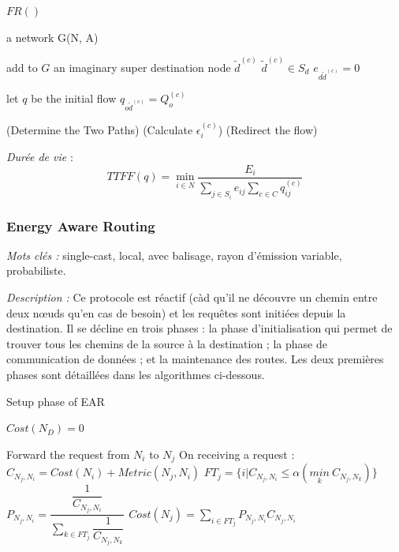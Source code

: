\begin{algorithm}[H]
\caption{$FR()$}
\label{algo_FR}
\begin{algorithmic}
\REQUIRE a network G(N, A)

add to $G$ an imaginary super destination node $\tilde{d}^{(c)}$
	\STATE $\tilde{d}^{(c)} \in S_d$
	\STATE $e_{d \tilde{d}^{(c)}} = 0$
\ENDFOR

let $q$ be the initial flow
	\STATE $q_{o \tilde{d}^{(c)}} = Q_o^{(c)}$
\ENDFOR

		\STATE (Determine the Two Paths)
		\STATE (Calculate $\epsilon_i^{(c)}$)
		\STATE (Redirect the flow)
	\ENDFOR
\ENDFOR

\RETURN 
\end{algorithmic}
\end{algorithm}



\emph{Durée de vie} :  $$TTFF(q) = \min\limits_{i \in N}\frac{E_i}{\sum \limits_{j \in S_i} {e_{ij}} \sum \limits_{c \in C} {q_{ij}^{(c)}}}$$



\subsubsection{Energy Aware Routing \cite{Shah2002}}
\emph{Mots clés :} single-cast, local, avec balisage, rayon d'émission variable, probabiliste.

\emph{Description :}
Ce protocole est réactif (càd qu'il ne découvre un chemin entre deux nœuds qu’en cas de besoin) et les requêtes sont initiées depuis la destination. Il se décline en trois phases : la phase d'initialisation qui permet de trouver tous les chemins de la source à la destination ; la phase de communication de données ; et la maintenance des routes. Les deux premières phases sont détaillées dans les algorithmes ci-dessous.

\begin{algorithm}[H]
\caption{Setup phase of EAR}
\label{algo_EAR_sp}
\begin{algorithmic}

\STATE $Cost(N_D) = 0$

			\STATE Forward the request from $N_i$ to $N_j$
		\ENDIF
	\ENDFOR
\ENDFOR
\STATE
{}
		\STATE On receiving a request :
		\STATE $C_{N_j,N_i} = Cost(N_i)+Metric(N_j,N_i)$
		\STATE $FT_j = \{i | C_{N_j,N_i} \leq \alpha (\underset{k}{min}\ C_{N_j,N_k})\}$
		\STATE
		\STATE $P_{N_j,N_i} = \dfrac{\dfrac{1}{C_{N_j,N_i}}}{\sum \limits_{k \in FT_j} \dfrac{1}{C_{N_j,N_k}}}$
		\STATE
		\STATE $Cost(N_j) = \sum \limits_{i \in FT_j} {P_{N_j,N_i} C_{N_j,N_i}}$
	\ENDFOR
\ENDFOR
\end{algorithmic}
\end{algorithm}


